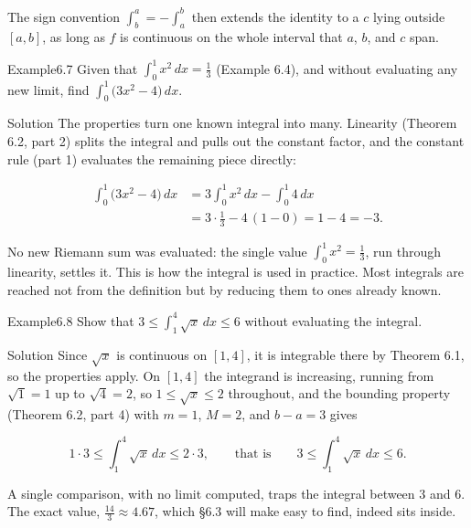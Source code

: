 \documentclass[a4paper,12pt,oneside]{memoir}
\begin{document}
The sign convention \(\int_{b}^{a} = -\int_{a}^{b}\) then extends the identity to a \(c\) lying outside \([a, b]\), as long as \(f\) is continuous on the whole interval that \(a\), \(b\), and \(c\) span.

\begin{workedexample}
\begin{envexample}{Example}{6.7}{}
Given that \(\displaystyle\int_{0}^{1} x^{2}\,dx = \tfrac{1}{3}\) (Example 6.4), and without evaluating any new limit, find \(\displaystyle\int_{0}^{1} \bigl(3x^{2} - 4\bigr)\,dx\).
\end{envexample}
\begin{envsolution}{Solution}{}{}
The properties turn one known integral into many. Linearity (Theorem 6.2, part 2) splits the integral and pulls out the constant factor, and the constant rule (part 1) evaluates the remaining piece directly:

\[ \begin{aligned}
          \int_{0}^{1} \bigl(3x^{2} - 4\bigr)\,dx &= 3\int_{0}^{1} x^{2}\,dx - \int_{0}^{1} 4\,dx \\[2pt]
                                                   &= 3\cdot\tfrac{1}{3} - 4\,(1 - 0) = 1 - 4 = -3.
        \end{aligned} \]

No new Riemann sum was evaluated: the single value \(\int_{0}^{1} x^{2} = \tfrac{1}{3}\), run through linearity, settles it. This is how the integral is used in practice. Most integrals are reached not from the definition but by reducing them to ones already known. \qedmark
\end{envsolution}
\end{workedexample}
\begin{workedexample}
\begin{envexample}{Example}{6.8}{}
Show that \(\displaystyle 3 \le \int_{1}^{4} \sqrt{x}\,dx \le 6\) without evaluating the integral.
\end{envexample}
\begin{envsolution}{Solution}{}{}
Since \(\sqrt{x}\) is continuous on \([1, 4]\), it is integrable there by Theorem 6.1, so the properties apply. On \([1, 4]\) the integrand is increasing, running from \(\sqrt{1} = 1\) up to \(\sqrt{4} = 2\), so \(1 \le \sqrt{x} \le 2\) throughout, and the bounding property (Theorem 6.2, part 4) with \(m = 1\), \(M = 2\), and \(b - a = 3\) gives

\[ 1 \cdot 3 \le \int_{1}^{4} \sqrt{x}\,dx \le 2 \cdot 3, \qquad\text{that is}\qquad 3 \le \int_{1}^{4} \sqrt{x}\,dx \le 6. \]

A single comparison, with no limit computed, traps the integral between \(3\) and \(6\). The exact value, \(\tfrac{14}{3} \approx 4.67\), which §6.3 will make easy to find, indeed sits inside. \qedmark
\end{envsolution}
\end{workedexample}
\end{document}
